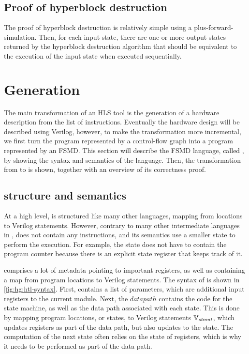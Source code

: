 \subsection{Proof of hyperblock destruction}

The proof of hyperblock destruction is relatively simple using a
\gls{plus-forward-simulation}.  Then, for each input state, there are one or
more output states returned by the hyperblock destruction algorithm that should
be equivalent to the execution of the input state when executed sequentially.

\section{\htl{} Generation}%
\label{sec:hg:htl-generation}

The main transformation of an HLS tool is the generation of a hardware
description from the list of instructions.  Eventually the hardware design will
be described using Verilog, however, to make the transformation more
incremental, we first turn the program represented by a control-flow graph into
a program represented by an \gls{FSMD}.  This section will describe the
\gls{FSMD} language, called \htl{}, by showing the syntax and semantics of the
language.  Then, the transformation from \rtlsubpar{} to \htl{} is shown,
together with an overview of its correctness proof.

\subsection{\htl{} structure and semantics}%
\label{sec:hg:htl-structure-and-semantics}

At a high level, \htl{} is structured like many other \compcert{} languages,
mapping from locations to Verilog statements.  However, contrary to many other
intermediate languages in \compcert{}, \htl{} does not contain any instructions,
and its semantics use a smaller state to perform the execution.  For example,
the state does not have to contain the program counter because there is an
explicit state register that keeps track of it.

\htl{} comprises a lot of metadata pointing to important registers, as well as
containing a map from program locations to Verilog statements.  The syntax of
\htl{} is shown in \cref{fig:hg:htl-syntax}.  First, \htl{} contains a list of
parameters, which are additional input registers to the current module.  Next,
the $\mathit{datapath}$ contains the code for the state machine, as well as the
data path associated with each state.  This is done by mapping program
locations, or states, to Verilog statements $\mathbb{V}_\mathit{stmnt}$, which updates
registers as part of the data path, but also updates to the state.  The
computation of the next state often relies on the state of registers, which is
why it needs to be performed as part of the data path.

